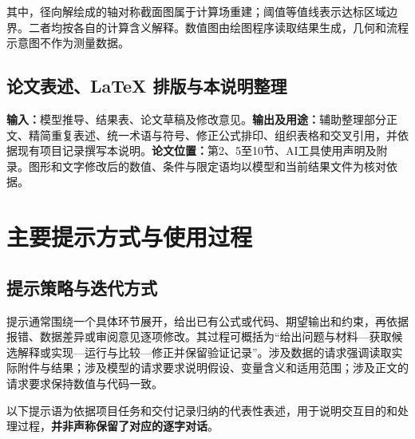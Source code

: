 \documentclass[withoutpreface,bwprint]{commons/cumcmthesis}
\newcommand{\field}[1]{\mbox{\textbf{#1：}}}
\begin{document}
其中，径向解绘成的轴对称截面图属于计算场重建；阈值等值线表示达标区域边界。二者均按各自的计算含义解释。数值图由绘图程序读取结果生成，几何和流程示意图不作为测量数据。

\subsection{论文表述、LaTeX 排版与本说明整理}
\field{输入}模型推导、结果表、论文草稿及修改意见。\field{输出及用途}辅助整理部分正文、精简重复表述、统一术语与符号、修正公式排印、组织表格和交叉引用，并依据现有项目记录撰写本说明。\field{论文位置}第2、5至10节、AI工具使用声明及附录。图形和文字修改后的数值、条件与限定语均以模型和当前结果文件为核对依据。

\section{主要提示方式与使用过程}
\subsection{提示策略与迭代方式}
提示通常围绕一个具体环节展开，给出已有公式或代码、期望输出和约束，再依据报错、数据差异或审阅意见逐项修改。其过程可概括为“给出问题与材料---获取候选解释或实现---运行与比较---修正并保留验证记录”。涉及数据的请求强调读取实际附件与结果；涉及模型的请求要求说明假设、变量含义和适用范围；涉及正文的请求要求保持数值与代码一致。

以下提示语为依据项目任务和交付记录归纳的代表性表述，用于说明交互目的和处理过程，\textbf{并非声称保留了对应的逐字对话}。
\end{document}
